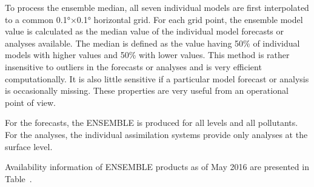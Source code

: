 \documentclass[9pt]{report}
\begin{document}
\noindent{}To process the ensemble median, all seven individual models are first interpolated to a common 0.1°×0.1° horizontal grid. 
For each grid point, the ensemble model value is calculated as the median value of the individual model forecasts or analyses available. 
The median is defined as the value having 50\% of individual models with higher values and 50\% with lower values. 
This method is rather insensitive to outliers in the forecasts or analyses and is very efficient computationally. 
It is also little sensitive if a particular model forecast or analysis is occasionally missing.
These properties are very useful from an operational point of view.%

For the forecasts, the ENSEMBLE is produced for all levels and all pollutants. 
For the analyses, the individual assimilation systems provide only analyses at the surface level.%

Availability information of ENSEMBLE products as of May 2016 are presented in Table~.%

\begin{table}[h!]%
\begin{mdcenter}%
{}%
\end{mdcenter}\label{ensemble-portfolio}%
\end{table}%
\end{document}
